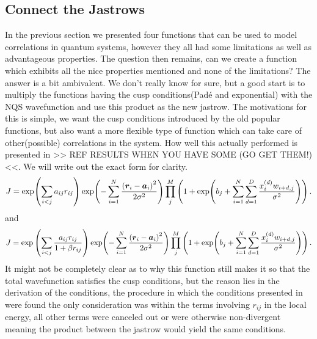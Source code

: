     \subsection{Connect the Jastrows}
        In the previous section we presented four functions that can be used to
        model correlations in quantum systems, however they all had some
        limitations as well as advantageous properties. The question then
        remains, can we create a function which exhibits all the nice
        properties mentioned and none of the limitations? The answer is a bit
        ambivalent. We don't really know for sure, but a good start is to
        multiply the functions having the cusp conditions(Pad\'e and
        exponential) with the NQS wavefunction and use this product as the new
        jastrow. The motivations for this is simple, we want the cusp
        conditions introduced by the old popular functions, but also want a
        more flexible type of function which can take care of other(possible)
        correlations in the system. How well this actually performed is
        presented in >> REF RESULTS WHEN YOU HAVE SOME (GO GET THEM!) <<. We
        will write out the exact form for clarity.
            \begin{equation}
                J = \exp(\sum\limits_{i<j}a_{ij} r_{ij})
                \exp(-\suml{i=1}{N} \frac{\left(\blds{r}_i -
                \blds{a}_i\right)^2}{2\sigma^2})\prod\limits^{M}_j \left(1 +
                \exp(b_j + \suml{i=1}{N}\suml{d=1}{D}
                \frac{x^{(d)}_iw_{i+d,j}}{\sigma^2})\right).
            \end{equation}
        and
            \begin{equation}
                J = \exp\left(\sum\limits_{i<j}\frac{a_{ij} r_{ij}}{1 + \beta
                r_{ij}}\right) \exp(-\suml{i=1}{N} \frac{\left(\blds{r}_i -
                \blds{a}_i\right)^2}{2\sigma^2})\prod\limits^{M}_j \left(1 +
                \exp(b_j + \suml{i=1}{N}\suml{d=1}{D}
                \frac{x^{(d)}_iw_{i+d,j}}{\sigma^2})\right).
            \end{equation}
        It might not be completely clear as to why this function still makes it
        so that the total wavefunction satisfies the cusp conditions, but the
        reason lies in the derivation of the conditions, the procedure in which
        the conditions presented in  were found the
        only consideration was within the terms involving $r_{ij}$ in the local
        energy, all other terms were canceled out or were otherwise
        non-divergent meaning the product between the jastrow would yield the
        same conditions.

